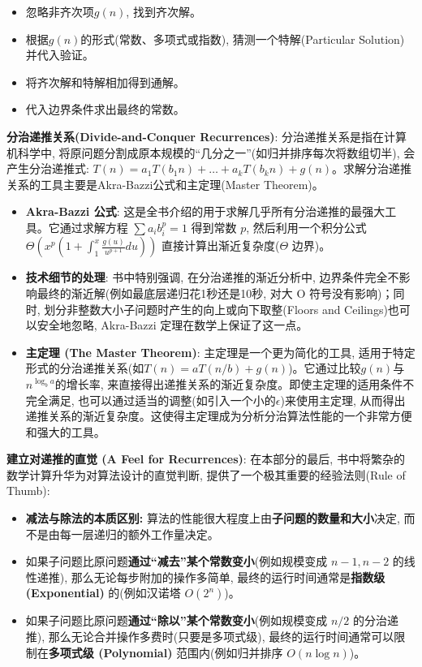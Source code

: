 \documentclass[12pt, a4paper, UTF8]{ctexart}
\newcommand{\term}[1]{\textbf{\textcolor{blue!80!black}{#1}}}
\newcommand{\emphb}[1]{\textbf{#1}}
\begin{document}
\begin{sloppypar}
    \begin{itemize}[nosep]
        \item 忽略非齐次项$g(n)$, 找到齐次解。
        \item 根据$g(n)$的形式(常数、多项式或指数), 猜测一个特解(Particular Solution)并代入验证。
        \item 将齐次解和特解相加得到通解。
        \item 代入边界条件求出最终的常数。
    \end{itemize}
    \term{分治递推关系(Divide-and-Conquer Recurrences)}: 分治递推关系是指在计算机科学中, 将原问题分割成原本规模的“几分之一”(如归并排序每次将数组切半), 会产生分治递推式: $T(n) = a_1T(b_1 n) + \dots + a_k T(b_k n) + g(n)$。求解分治递推关系的工具主要是Akra-Bazzi公式和主定理(Master Theorem)。
    \begin{itemize}[nosep]
        \item \term{Akra-Bazzi 公式}: 这是全书介绍的用于求解几乎所有分治递推的最强大工具。它通过求解方程 $\sum a_i b_i^p = 1$ 得到常数 $p$, 然后利用一个积分公式 $\Theta(x^p (1 + \int_1^x \frac{g(u)}{u^{p+1}} du))$ 直接计算出渐近复杂度($\Theta$ 边界)。
        \item \emphb{技术细节的处理}: 书中特别强调, 在分治递推的渐近分析中, 边界条件完全不影响最终的渐近解(例如最底层递归花1秒还是10秒, 对大 O 符号没有影响)；同时, 划分非整数大小子问题时产生的向上或向下取整(Floors and Ceilings)也可以安全地忽略, Akra-Bazzi 定理在数学上保证了这一点。
        \item \term{主定理 (The Master Theorem)}: 主定理是一个更为简化的工具, 适用于特定形式的分治递推关系(如$T(n) = aT(n/b) + g(n)$)。它通过比较$g(n)$与$n^{\log_b a}$的增长率, 来直接得出递推关系的渐近复杂度。即使主定理的适用条件不完全满足, 也可以通过适当的调整(如引入一个小的$\epsilon$)来使用主定理, 从而得出递推关系的渐近复杂度。这使得主定理成为分析分治算法性能的一个非常方便和强大的工具。
    \end{itemize}
    \emphb{建立对递推的直觉 (A Feel for Recurrences)}: 在本部分的最后, 书中将繁杂的数学计算升华为对算法设计的直觉判断, 提供了一个极其重要的经验法则(Rule of Thumb):
    \begin{itemize}[nosep]
        \item \emphb{减法与除法的本质区别: }算法的性能很大程度上由\emphb{子问题的数量和大小}决定, 而不是由每一层递归的额外工作量决定。
        \item 如果子问题比原问题\emphb{通过“减去”某个常数变小}(例如规模变成 $n-1, n-2$ 的线性递推), 那么无论每步附加的操作多简单, 最终的运行时间通常是\emphb{指数级 (Exponential)} 的(例如汉诺塔 $O(2^n)$)。
        \item 如果子问题比原问题\emphb{通过“除以”某个常数变小}(例如规模变成 $n/2$ 的分治递推), 那么无论合并操作多费时(只要是多项式级), 最终的运行时间通常可以限制在\emphb{多项式级 (Polynomial)} 范围内(例如归并排序 $O(n \log n)$)。
    \end{itemize}

\end{sloppypar}
\end{document}
